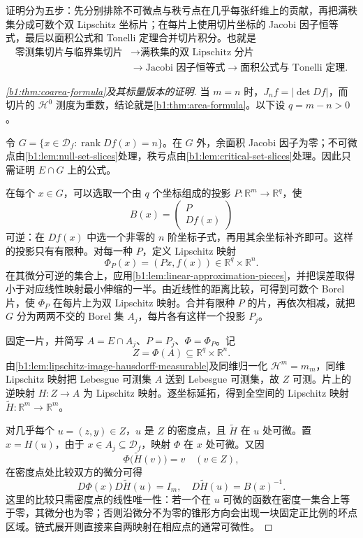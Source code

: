 证明分为五步：先分别排除不可微点与秩亏点在几乎每张纤维上的贡献，再把满秩集分成可数个双 Lipschitz 坐标片；在每片上使用切片坐标的 Jacobi 因子恒等式，最后以面积公式和 Tonelli 定理合并切片积分。也就是
\[
 \begin{aligned}
 \text{零测集切片与临界集切片}
 &\longrightarrow\text{满秩集的双 Lipschitz 分片}\\
 &\longrightarrow\text{Jacobi 因子恒等式}
 \longrightarrow\text{面积公式与 Tonelli 定理}.
 \end{aligned}
\]

\begin{proof}[\cref{b1:thm:coarea-formula}及其标量版本的证明]
当 \(m=n\) 时，\(J_nf=|\det Df|\)，而切片的 \(\mathcal H^0\) 测度为重数，结论就是\cref{b1:thm:area-formula}。以下设 \(q=m-n>0\)。

令 \(G=\{x\in\mathcal D_f:\operatorname{rank}Df(x)=n\}\)。在 \(G\) 外，余面积 Jacobi 因子为零；不可微点由\cref{b1:lem:null-set-slices}处理，秩亏点由\cref{b1:lem:critical-set-slices}处理。因此只需证明 \(E\cap G\) 上的公式。

在每个 \(x\in G\)，可以选取一个由 \(q\) 个坐标组成的投影 \(P:\mathbb R^m\rightarrow\mathbb R^q\)，使
\[
 B(x)=\begin{pmatrix}P\\ Df(x)\end{pmatrix}
\]
可逆：在 \(Df(x)\) 中选一个非零的 \(n\) 阶坐标子式，再用其余坐标补齐即可。这样的投影只有有限种。对每一种 \(P\)，定义 Lipschitz 映射
\[
 \Phi_P(x)=(Px,f(x))\in\mathbb R^q\times\mathbb R^n.
\]
在其微分可逆的集合上，应用\cref{b1:lem:linear-approximation-pieces}，并把误差取得小于对应线性映射最小伸缩的一半。由近线性的距离比较，可得到可数个 Borel 片，使 \(\Phi_P\) 在每片上为双 Lipschitz 映射。合并有限种 \(P\) 的片，再依次相减，就把 \(G\) 分为两两不交的 Borel 集 \(A_j\)，每片各有这样一个投影 \(P_j\)。

固定一片，并简写 \(A=E\cap A_j\)、\(P=P_j\)、\(\Phi=\Phi_P\)。记
\[
 Z=\Phi(A)\subseteq\mathbb R^q\times\mathbb R^n.
\]
由\cref{b1:lem:lipschitz-image-hausdorff-measurable}及同维归一化 \(\mathcal H^m=m_m\)，同维 Lipschitz 映射把 Lebesgue 可测集 \(A\) 送到 Lebesgue 可测集，故 \(Z\) 可测。片上的逆映射 \(H:Z\rightarrow A\) 为 Lipschitz 映射。逐坐标延拓，得到全空间的 Lipschitz 映射 \(\widetilde H:\mathbb R^m\rightarrow\mathbb R^m\)。

对几乎每个 \(u=(z,y)\in Z\)，\(u\) 是 \(Z\) 的密度点，且 \(\widetilde H\) 在 \(u\) 处可微。置 \(x=H(u)\)，由于 \(x\in A_j\subseteq\mathcal D_f\)，映射 \(\Phi\) 在 \(x\) 处可微。又因
\[
 \Phi\bigl(\widetilde H(v)\bigr)=v\quad(v\in Z),
\]
在密度点处比较双方的微分可得
\[
 D\Phi(x)D\widetilde H(u)=I_m,\quad
 D\widetilde H(u)=B(x)^{-1}.
\]
这里的比较只需密度点的线性唯一性：若一个在 \(u\) 可微的函数在密度一集合上等于零，其微分也为零；否则沿微分不为零的锥形方向会出现一块固定正比例的坏点区域。链式展开则直接来自两映射在相应点的通常可微性。


\end{proof}

